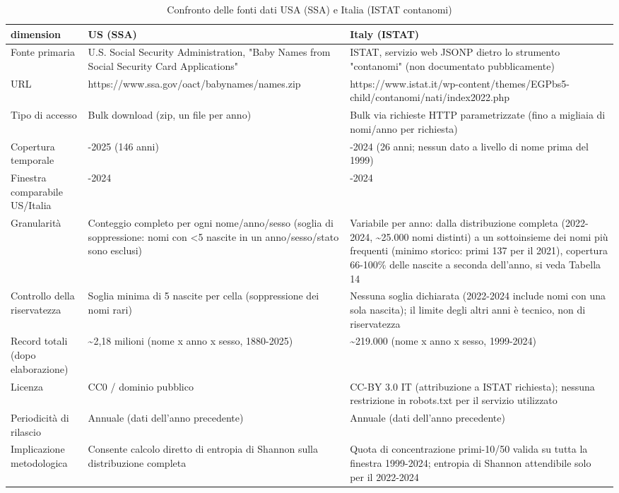 \begin{table}[t]
\centering
\scriptsize
\caption{Confronto delle fonti dati USA (SSA) e Italia (ISTAT contanomi)}
\label{tab:dataset_overview}
\begin{tabular}{>{\raggedright\arraybackslash}p{3.2cm} >{\raggedright\arraybackslash}p{6.3cm} >{\raggedright\arraybackslash}p{6.3cm}}
\toprule
\textbf{dimension} & \textbf{US (SSA)} & \textbf{Italy (ISTAT)} \\
\midrule
Fonte primaria & U.S. Social Security Administration, "Baby Names from Social Security Card Applications" & ISTAT, servizio web JSONP dietro lo strumento "contanomi" (non documentato pubblicamente) \\
URL & https://www.ssa.gov/oact/babynames/names.zip & https://www.istat.it/wp-content/themes/EGPbs5-child/contanomi/nati/index2022.php \\
Tipo di accesso & Bulk download (zip, un file per anno) & Bulk via richieste HTTP parametrizzate (fino a migliaia di nomi/anno per richiesta) \\
Copertura temporale & 1880-2025 (146 anni) & 1999-2024 (26 anni; nessun dato a livello di nome prima del 1999) \\
Finestra comparabile US/Italia & 1999-2024 & 1999-2024 \\
Granularità & Conteggio completo per ogni nome/anno/sesso (soglia di soppressione: nomi con <5 nascite in un anno/sesso/stato sono esclusi) & Variabile per anno: dalla distribuzione completa (2022-2024, \textasciitilde{}25.000 nomi distinti) a un sottoinsieme dei nomi più frequenti (minimo storico: primi 137 per il 2021), copertura 66-100\% delle nascite a seconda dell'anno, si veda Tabella 14 \\
Controllo della riservatezza & Soglia minima di 5 nascite per cella (soppressione dei nomi rari) & Nessuna soglia dichiarata (2022-2024 include nomi con una sola nascita); il limite degli altri anni è tecnico, non di riservatezza \\
Record totali (dopo elaborazione) & \textasciitilde{}2,18 milioni (nome x anno x sesso, 1880-2025) & \textasciitilde{}219.000 (nome x anno x sesso, 1999-2024) \\
Licenza & CC0 / dominio pubblico & CC-BY 3.0 IT (attribuzione a ISTAT richiesta); nessuna restrizione in robots.txt per il servizio utilizzato \\
Periodicità di rilascio & Annuale (dati dell'anno precedente) & Annuale (dati dell'anno precedente) \\
Implicazione metodologica & Consente calcolo diretto di entropia di Shannon sulla distribuzione completa & Quota di concentrazione primi-10/50 valida su tutta la finestra 1999-2024; entropia di Shannon attendibile solo per il 2022-2024 \\
\bottomrule
\end{tabular}
\end{table}
